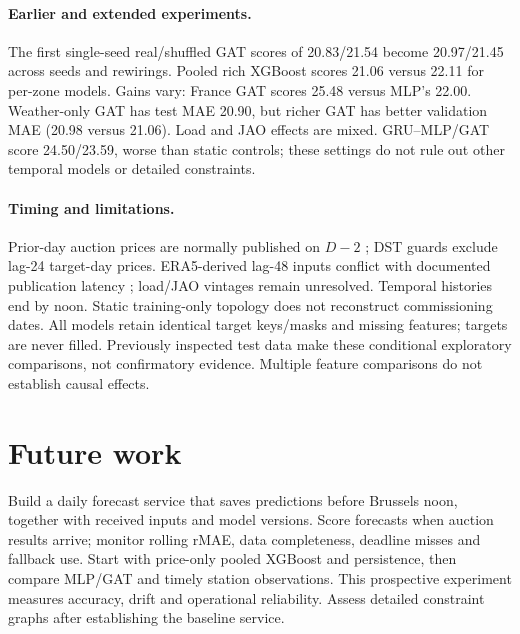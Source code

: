 {\paragraph{Earlier and extended experiments.} The first single-seed real/shuffled GAT scores of 20.83/21.54 become 20.97/21.45 across seeds and rewirings. Pooled rich XGBoost scores 21.06 versus 22.11 for per-zone models. Gains vary: France GAT scores 25.48 versus MLP's 22.00. Weather-only GAT has test MAE 20.90, but richer GAT has better validation MAE (20.98 versus 21.06). Load and JAO effects are mixed. GRU--MLP/GAT score 24.50/23.59, worse than static controls; these settings do not rule out other temporal models or detailed constraints.

\paragraph{Timing and limitations.} Prior-day auction prices are normally published on $D-2$ \cite{auction}; DST guards exclude lag-24 target-day prices. ERA5-derived lag-48 inputs conflict with documented publication latency \cite{era5}; load/JAO vintages remain unresolved. Temporal histories end by noon. Static training-only topology does not reconstruct commissioning dates. All models retain identical target keys/masks and missing features; targets are never filled. Previously inspected test data make these conditional exploratory comparisons, not confirmatory evidence. Multiple feature comparisons do not establish causal effects.

\section{Future work} Build a daily forecast service that saves predictions before Brussels noon, together with received inputs and model versions. Score forecasts when auction results arrive; monitor rolling rMAE, data completeness, deadline misses and fallback use. Start with price-only pooled XGBoost and persistence, then compare MLP/GAT and timely station observations. This prospective experiment measures accuracy, drift and operational reliability. Assess detailed constraint graphs after establishing the baseline service.
}
